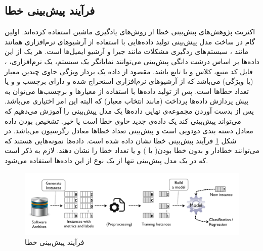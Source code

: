 \subsection{فرآیند پیش‌بینی خطا}
\label{subsec:process}
اکثریت پژوهش‌های پیش‌بینی خطا از روش‌های یادگیری ماشین  استفاده کرده‌اند. اولین گام در ساخت مدل پیش‌بینی تولید داده‌هایی با استفاده از آرشیو‌های نرم‌افزاری همانند  مانند ، سیستم‌های ردگیری مشکلات  مانند جیرا و آرشیو ایمیل‌ها است. هر یک از این داده‌ها بر اساس درشت دانگی پیش‌بینی می‌توانند نمایانگر یک سیستم، یک  نرم‌افزاری، ، فایل کد منبع، کلاس و یا تابع باشد. مقصود از داده یک بردار ویژگی حاوی چندین معیار (یا ویژگی) می‌باشد که از آرشیو‌های نرم‌افزاری استخراج شده و دارای برچسب  و    و یا تعداد خطاها است. پس از تولید داده‌ها با استفاده از معیارها و برچسب‌ها می‌توان به پیش پردازش داده‌ها پرداخت (مانند انتخاب معیار) که البته این امر اختیاری می‌باشد. پس از بدست آوردن مجموعه‌ی نهایی داده‌ها یک مدل پیش‌بینی را آموزش می‌دهیم که می‌تواند پیش‌بینی کند یک داده‌ی جدید حاوی خطا است یا خیر. تشخیص  بودن داده معادل دسته بندی دودویی است و پیش‌بینی تعداد خطاها معادل رگرسیون می‌باشد. در شکل \ref{fig:prediction-process} فرآیند پیش‌بینی خطا نشان داده شده است. داده‌ها نمونه‌هایی هستند که می‌توانند خطادار  و بدون  خطا  بودن(    یا    ) و یا تعداد خطا را نشان دهند. لازم به ذکر است که در یک مدل پیش‌بینی تنها از یک نوع از این داده‌ها استفاده می‌شود.

\begin{figure}[H]
	\centering
	\includegraphics[width=1.0\textwidth]{img/prediction-process.PNG}
	 \caption{فرآیند پیش‌بینی خطا \cite{nam2014survey}}
	\label{fig:prediction-process}
\end{figure}
